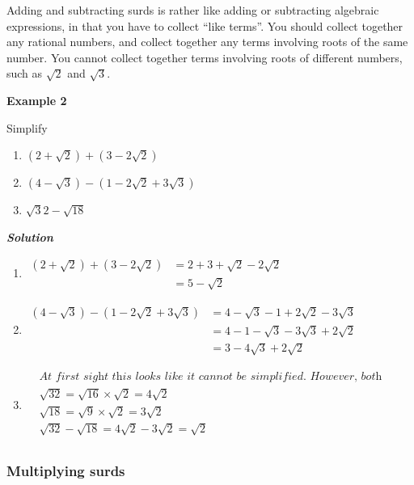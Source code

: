 \documentclass[
]{article}
\providecommand{\tightlist}{%
  \setlength{\itemsep}{0pt}\setlength{\parskip}{0pt}}
\begin{document}
Adding and subtracting surds is rather like adding or subtracting
algebraic expressions, in that you have to collect ``like terms''. You
should collect together any rational numbers, and collect together any
terms involving roots of the same number. You cannot collect together
terms involving roots of different numbers, such as \(\sqrt{2}\) and
\(\sqrt{3}\).

\textbf{Example 2}

Simplify

\begin{enumerate}
\def\labelenumi{(\alph{enumi})}
\tightlist
\item
  \((2+\sqrt{2})+(3-2\sqrt{2})\)
\item
  \((4-\sqrt{3})-(1-2\sqrt{2}+3\sqrt{3})\)
\item
  \(\sqrt32-\sqrt{18}\)
\end{enumerate}

\textbf{\emph{Solution}}

\begin{enumerate}
\def\labelenumi{(\alph{enumi})}
\item
  \(\begin{aligned} (2+\sqrt{2})+(3-2\sqrt{2}) &= 2+3+\sqrt{2}-2\sqrt{2} \\ &=5-\sqrt{2} \end{aligned}\)
\item
  \(\begin{aligned} (4-\sqrt{3})-(1-2\sqrt{2}+3\sqrt{3}) &= 4-\sqrt{3}-1+2\sqrt{2}-3\sqrt{3} \\ &=4-1-\sqrt{3}-3\sqrt{3}+2\sqrt{2} \\ &=3-4\sqrt{3}+2\sqrt{2} \end{aligned}\)
\item
  \(\begin{aligned} &\textit{At first sight this looks like it cannot be simplified. However, both surds can be written in terms of simpler surds (as in Example 1).} \\ &\sqrt{32}=\sqrt{16}\times\sqrt{2}=4\sqrt{2} \\ &\sqrt{18}=\sqrt{9}\times\sqrt{2}=3\sqrt{2} \\ &\sqrt{32}-\sqrt{18}=4\sqrt{2}-3\sqrt{2}=\sqrt{2} \\ \end{aligned}\)
\end{enumerate}

\hypertarget{multiplying-surds}{%
\subsubsection{Multiplying surds}\label{multiplying-surds}}
\end{document}
